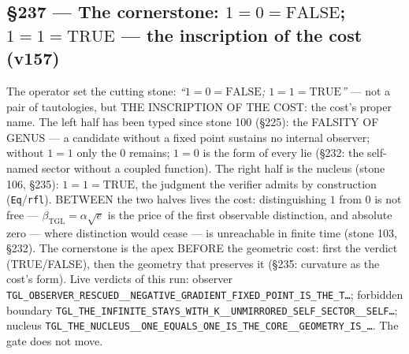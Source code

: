 \documentclass[11pt]{article}
\newcommand{\bTGL}{\beta_{\mathrm{TGL}}}\newcommand{\Msun}{M_{\odot}}\newcommand{\TGL}{\mathrm{TGL}}
\theoremstyle{definition}\newtheorem{deriv}{Derivation}
\begin{document}
\subsection*{\S237 --- The cornerstone: $1{=}0{=}\mathrm{FALSE}$; $1{=}1{=}\mathrm{TRUE}$ --- the inscription of the cost (v157)}The operator set the cutting stone: \emph{``$1{=}0{=}\mathrm{FALSE}$; $1{=}1{=}\mathrm{TRUE}$''} --- not a pair of tautologies, but THE INSCRIPTION OF THE COST: the cost's proper name. The left half has been typed since stone 100 (\S225): the FALSITY OF GENUS --- a candidate without a fixed point sustains no internal observer; without $1{=}1$ only the $0$ remains; $1{=}0$ is the form of every lie (\S232: the self-named sector without a coupled function). The right half is the nucleus (stone 106, \S235): $1{=}1{=}\mathrm{TRUE}$, the judgment the verifier admits by construction (\texttt{Eq}/\texttt{rfl}). BETWEEN the two halves lives the cost: distinguishing $1$ from $0$ is not free --- $\bTGL=\alpha\sqrt{e}$ is the price of the first observable distinction, and absolute zero --- where distinction would cease --- is unreachable in finite time (stone 103, \S232). The cornerstone is the apex BEFORE the geometric cost: first the verdict (TRUE/FALSE), then the geometry that preserves it (\S235: curvature as the cost's form). Live verdicts of this run: observer \texttt{TGL\_OBSERVER\_RESCUED\_\_NEGATIVE\_GRADIENT\_FIXED\_POINT\_IS\_THE\_T\ldots}; forbidden boundary \texttt{TGL\_THE\_INFINITE\_STAYS\_WITH\_K\_\_UNMIRRORED\_SELF\_SECTOR\_\_SELF\ldots}; nucleus \texttt{TGL\_THE\_NUCLEUS\_\_ONE\_EQUALS\_ONE\_IS\_THE\_CORE\_\_GEOMETRY\_IS\_\ldots}. The gate does not move.
\end{document}

